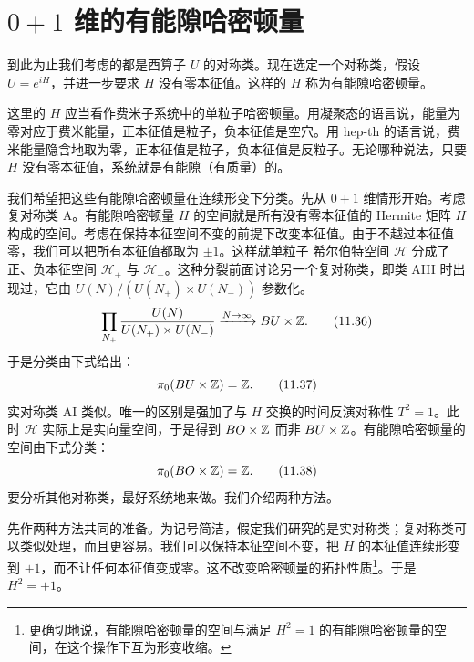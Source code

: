 
\section{$0+1$ 维的有能隙哈密顿量}

到此为止我们考虑的都是酉算子 $U$ 的对称类。现在选定一个对称类，假设 $U=e^{iH}$，并进一步要求 $H$ 没有零本征值。这样的 $H$ 称为有能隙哈密顿量。

这里的 $H$ 应当看作费米子系统中的单粒子哈密顿量。用凝聚态的语言说，能量为零对应于费米能量，正本征值是粒子，负本征值是空穴。用 hep-th 的语言说，费米能量隐含地取为零，正本征值是粒子，负本征值是反粒子。无论哪种说法，只要 $H$ 没有零本征值，系统就是有能隙（有质量）的。

我们希望把这些有能隙哈密顿量在连续形变下分类。先从 $0+1$ 维情形开始。考虑复对称类 A。有能隙哈密顿量 $H$ 的空间就是所有没有零本征值的 Hermite 矩阵 $H$ 构成的空间。考虑在保持本征空间不变的前提下改变本征值。由于不越过本征值零，我们可以把所有本征值都取为 $\pm1$。这样就单粒子 希尔伯特空间
$\mathcal{H}$ 分成了正、负本征空间 $\mathcal{H}_+$ 与 $\mathcal{H}_-$。这种分裂前面讨论另一个复对称类，即类 AIII 时出现过，它由 $U(N)/(U(N_+)\times U(N_-))$ 参数化。
\begin{equation}
\prod_{N_+}\frac{U(N)}{U(N_+)\times U(N_-)}\xrightarrow{N\to\infty}BU\times\mathbb{Z}. \tag{11.36}
\end{equation}
于是分类由下式给出：
\begin{equation}
\pi_0(BU\times\mathbb{Z})=\mathbb{Z}. \tag{11.37}
\end{equation}
实对称类 AI 类似。唯一的区别是强加了与 $H$ 交换的时间反演对称性 $T^2=1$。此时 $\mathcal{H}$ 实际上是实向量空间，于是得到 $BO\times\mathbb{Z}$ 而非 $BU\times\mathbb{Z}$。有能隙哈密顿量的空间由下式分类：
\begin{equation}
\pi_0(BO\times\mathbb{Z})=\mathbb{Z}. \tag{11.38}
\end{equation}
要分析其他对称类，最好系统地来做。我们介绍两种方法。

先作两种方法共同的准备。为记号简洁，假定我们研究的是实对称类；复对称类可以类似处理，而且更容易。我们可以保持本征空间不变，把 $H$ 的本征值连续形变到 $\pm1$，而不让任何本征值变成零。这不改变哈密顿量的拓扑性质\footnote[17]{更确切地说，有能隙哈密顿量的空间与满足 $H^2=1$ 的有能隙哈密顿量的空间，在这个操作下互为形变收缩。}。于是 $H^2=+1$。

